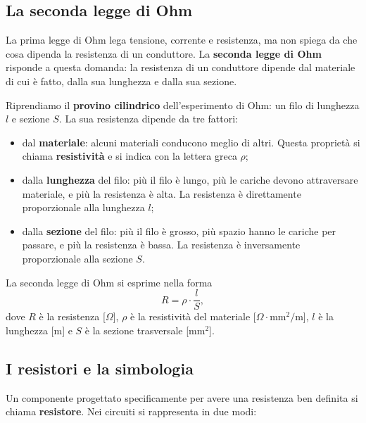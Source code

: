 \subsection{La seconda legge di Ohm}

La prima legge di Ohm lega tensione, corrente e resistenza, ma non spiega da che cosa dipenda la resistenza di un conduttore. La \textbf{seconda legge di Ohm} risponde a questa domanda: la resistenza di un conduttore dipende dal materiale di cui è fatto, dalla sua lunghezza e dalla sua sezione.

Riprendiamo il \textbf{provino cilindrico} dell'esperimento di Ohm: un filo di lunghezza \(l\) e sezione \(S\). La sua resistenza dipende da tre fattori:
\begin{itemize}[leftmargin=1cm]
  \item dal \textbf{materiale}: alcuni materiali conducono meglio di altri. Questa proprietà si chiama \textbf{resistività} e si indica con la lettera greca \(\rho\);
  \item dalla \textbf{lunghezza} del filo: più il filo è lungo, più le cariche devono attraversare materiale, e più la resistenza è alta. La resistenza è direttamente proporzionale alla lunghezza \(l\);
  \item dalla \textbf{sezione} del filo: più il filo è grosso, più spazio hanno le cariche per passare, e più la resistenza è bassa. La resistenza è inversamente proporzionale alla sezione \(S\).
\end{itemize}

La seconda legge di Ohm si esprime nella forma
\[
R = \rho \cdot \frac{l}{S},
\]
dove \(R\) è la resistenza [\(\Omega\)], \(\rho\) è la resistività del materiale [\(\Omega \cdot \text{mm}^2/\text{m}\)], \(l\) è la lunghezza [\(\text{m}\)] e \(S\) è la sezione trasversale [\(\text{mm}^2\)].

\subsection{I resistori e la simbologia}

Un componente progettato specificamente per avere una resistenza ben definita si chiama \textbf{resistore}. Nei circuiti si rappresenta in due modi:

\begin{figure}[htbp]
\centering
{}
\end{figure}

